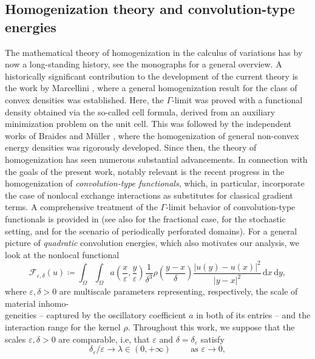 \documentclass[reqno,11pt]{amsart}
\numberwithin{equation}{section}
\theoremstyle{thmlemcorr}
\numberwithin{theorem}{section}
\theoremstyle{thmlemcorr*}
\theoremstyle{defi}
\theoremstyle{remexample}
\theoremstyle{ass}
\newcommand{\1}{\mathds{1}}
\newcommand{\Om}{\Omega}
\newcommand{\veps}{\varepsilon}
\newcommand{\dl}{\,\mathrm{d}}
\begin{document}
\subsection*{Homogenization theory and convolution-type energies}

 The mathematical theory of homogenization in the calculus of variations has by now a long-standing history, see the monographs \cite{BrDe98,CioDo99, BeRy18} for a general overview. A historically significant contribution to the development of the current theory is the work by Marcellini \cite{Ma78}, where a general homogenization result for the class of convex densities was established. Here, the \(\Gamma\)-limit was proved with a functional density obtained via the so-called cell formula, derived from an auxiliary minimization problem on the unit cell. %
This was followed by the independent works of Braides \cite{Br85} and M\"uller \cite{Mu87}, where the homogenization of general non-convex energy densities was rigorously developed.
Since then, the theory of homogenization has seen numerous substantial advancements. In connection with the goals of the present work, notably relevant is the recent progress in the homogenization of \textit{convolution-type functionals}, which, in particular, incorporate the case of nonlocal exchange interactions as substitutes for classical gradient terms. A comprehensive treatment of the $\Gamma$-limit behavior of convolution-type functionals is provided in \cite{AAB23} (see also \cite{BBD24} for the fractional case, \cite{BrP21} for the stochastic setting, and\cite{BrP22} for the scenario of periodically perforated domains). For a general picture of \textit{quadratic} convolution energies, which also motivates our analysis, we look at the nonlocal functional
\begin{equation}\label{eq:conv_hom_proto}	{\mathcal{F}}_{\veps,\delta}(u)\coloneqq 
		\int_\Om\int_\Om a\left(\frac{x}{\veps},\frac{y}{\veps}\right) \frac{1}{\delta^3}\rho\left(\frac{y-x}{\delta}\right)\frac{|u(y)-u(x)|^2}{|y-x|^2} \dl x\dl y,
	\end{equation}
    where $\veps, \delta > 0$ are multiscale parameters representing, respectively, the scale of material inhomo-\\geneities -- captured by the oscillatory coefficient $a$ in both of its entries -- and the interaction range for the kernel $\rho$. Throughout this work, we suppose that the scales \(\veps,\delta>0\) are comparable, i.e, that $\varepsilon$ and $\delta=\delta_\varepsilon$ satisfy \begin{equation}\label{eq:comp_scales}
	\delta_\varepsilon/\varepsilon \to \lambda \in(0,+\infty)
		\qquad \text{ as } \varepsilon \to 0,
	\end{equation}
\end{document}
